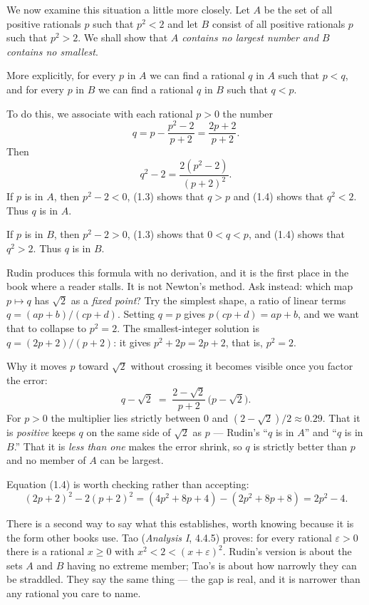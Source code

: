 We now examine this situation a little more closely. Let $A$ be the set of all
positive rationals $p$ such that $p^2 < 2$ and let $B$ consist of all positive
rationals $p$ such that $p^2 > 2$. We shall show that \emph{$A$ contains no
largest number and $B$ contains no smallest}.

More explicitly, for every $p$ in $A$ we can find a rational $q$ in $A$ such
that $p < q$, and for every $p$ in $B$ we can find a rational $q$ in $B$ such
that $q < p$.

To do this, we associate with each rational $p > 0$ the number
\begin{equation}
  q = p - \frac{p^2-2}{p+2} = \frac{2p+2}{p+2}. \tag{1.3}
\end{equation}
Then
\begin{equation}
  q^2 - 2 = \frac{2(p^2-2)}{(p+2)^2}. \tag{1.4}
\end{equation}
If $p$ is in $A$, then $p^2 - 2 < 0$, (1.3) shows that $q > p$ and (1.4) shows
that $q^2 < 2$. Thus $q$ is in $A$.

If $p$ is in $B$, then $p^2 - 2 > 0$, (1.3) shows that $0 < q < p$, and (1.4)
shows that $q^2 > 2$. Thus $q$ is in $B$.

\begin{unpack}
Rudin produces this formula with no derivation, and it is the first place in the
book where a reader stalls. It is not Newton's method. Ask instead: which map
$p \mapsto q$ has $\sqrt2$ as a \emph{fixed point}? Try the simplest shape, a
ratio of linear terms $q = (ap+b)/(cp+d)$. Setting $q = p$ gives
$p(cp+d) = ap+b$, and we want that to collapse to $p^2 = 2$. The
smallest-integer solution is $q = (2p+2)/(p+2)$: it gives $p^2 + 2p = 2p+2$,
that is, $p^2 = 2$.

Why it moves $p$ toward $\sqrt2$ without crossing it becomes visible once you
factor the error:
\[
  q - \sqrt2 \;=\; \frac{2-\sqrt2}{p+2}\,\bigl(p - \sqrt2\bigr).
\]
For $p>0$ the multiplier lies strictly between $0$ and
$(2-\sqrt2)/2 \approx 0.29$. That it is \emph{positive} keeps $q$ on the same
side of $\sqrt2$ as $p$ --- Rudin's ``$q$ is in $A$'' and ``$q$ is in $B$.'' That
it is \emph{less than one} makes the error shrink, so $q$ is strictly better
than $p$ and no member of $A$ can be largest.

Equation (1.4) is worth checking rather than accepting:
\[ (2p+2)^2 - 2(p+2)^2 = (4p^2+8p+4)-(2p^2+8p+8) = 2p^2-4. \]

\smallskip
There is a second way to say what this establishes, worth knowing because it is
the form other books use. Tao (\emph{Analysis I}, 4.4.5) proves: for every
rational $\varepsilon>0$ there is a rational $x \ge 0$ with
$x^2 < 2 < (x+\varepsilon)^2$. Rudin's version is about the sets $A$ and $B$
having no extreme member; Tao's is about how narrowly they can be straddled.
They say the same thing --- the gap is real, and it is narrower than any
rational you care to name.
\end{unpack}

